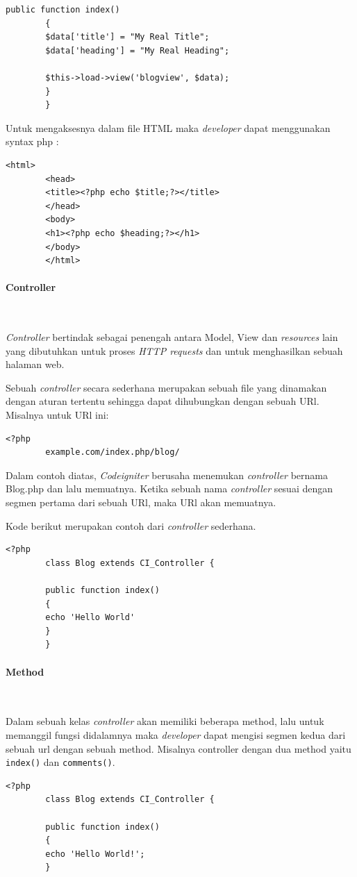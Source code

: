 \documentclass[a4paper,twoside]{article}
\newcommand{\myparagraph}[1]{\paragraph{#1}\mbox{}\\}
\begin{document}
\begin{enumerate}
\begin{lstlisting}[frame=single]
		public function index()
		{
		$data['title'] = "My Real Title";
		$data['heading'] = "My Real Heading";
		
		$this->load->view('blogview', $data);
		}
		}
		\end{lstlisting}
		
		Untuk mengaksesnya dalam file HTML maka \textit{developer} dapat menggunakan syntax php :
		\begin{lstlisting}[frame=single] 
		<html>
		<head>
		<title><?php echo $title;?></title>
		</head>
		<body>
		<h1><?php echo $heading;?></h1>
		</body>
		</html>
		\end{lstlisting}
		
		\myparagraph{Controller} \par
		\textit{Controller} bertindak sebagai penengah antara Model, View dan \textit{resources} lain yang dibutuhkan untuk proses \textit{HTTP requests} dan untuk menghasilkan sebuah halaman web.
		
		Sebuah \textit{controller} secara sederhana merupakan sebuah file yang dinamakan dengan aturan tertentu sehingga dapat dihubungkan dengan sebuah URl.
		Misalnya untuk URl ini:
		\begin{lstlisting}[frame=single] 
		<?php
		example.com/index.php/blog/
		\end{lstlisting}
		
		Dalam contoh diatas, \textit{Codeigniter} berusaha menemukan \textit{controller} bernama Blog.php dan lalu memuatnya. Ketika sebuah nama \textit{controller} sesuai dengan segmen pertama dari sebuah URl, maka URl akan memuatnya.
		
		Kode berikut merupakan contoh dari \textit{controller} sederhana.
		\begin{lstlisting}[frame=single] 
		<?php
		class Blog extends CI_Controller {
		
		public function index()
		{
		echo 'Hello World'
		}
		}
		\end{lstlisting} 
		
		\myparagraph{Method} \par
		Dalam sebuah kelas \textit{controller} akan memiliki beberapa method, lalu untuk memanggil fungsi didalamnya maka \textit{developer} dapat mengisi segmen kedua dari sebuah url dengan sebuah method. Misalnya controller dengan dua method yaitu \texttt{index()} dan \texttt{comments()}.
		\begin{lstlisting}[frame=single] 
		<?php
		class Blog extends CI_Controller {
		
		public function index()
		{
		echo 'Hello World!';
		}
		

\end{lstlisting}
\end{enumerate}
\end{document}
